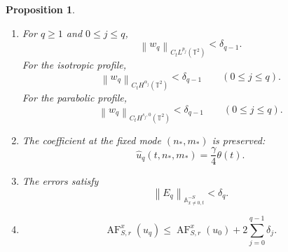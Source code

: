 \documentclass[12pt,reqno,letterpaper]{amsart}
\numberwithin{equation}{section}
\newtheorem{proposition}[theorem]{Proposition}
\theoremstyle{definition}
\newcommand{\T}{\mathbb T}
\newcommand{\A}{\mathbb A}
\newcommand{\norm}[1]{\left\lVert #1\right\rVert}
\begin{document}
\begin{proposition}
\begin{enumerate}[label=\textup{(\roman*)}]
 \item For $q\geq1$ and $0\leq j\leq q$,
 \begin{equation*}
  \norm{w_q}_{C_tL^{p_j}(\T^2)}<\delta_{q-1}.
 \end{equation*}
 For the isotropic profile,
 \begin{equation}\label{eq:periodic-induction-Sobolev-diagonal}
  \norm{w_q}_{C_tH^{\alpha_j}(\T^2)}
  <\delta_{q-1}
  \qquad(0\leq j\leq q).
 \end{equation}
 For the parabolic profile,
 \begin{equation}\label{eq:periodic-induction-parabolic-Sobolev-diagonal}
  \norm{w_q}_{C_tH^{s_j,0}(\T^2)}
  <\delta_{q-1}
  \qquad(0\leq j\leq q).
 \end{equation}

 \item The coefficient at the fixed mode $(n_*,m_*)$ is preserved:
 \begin{equation}\label{eq:periodic-induction-preserved-coefficient}
  \widehat u_q(t,n_*,m_*)=\frac\gamma4\theta(t).
 \end{equation}

 \item The errors satisfy
 \begin{equation}\label{eq:periodic-induction-error}
  \norm{E_q}_{\A^{-S}_{x\neq0,t}}<\delta_q.
 \end{equation}

 \item
 \begin{equation}\label{eq:Qbound}
  \operatorname{AF}_{S,r}^x(u_q)
  \leq\operatorname{AF}_{S,r}^x(u_0)
   +2\sum_{j=0}^{q-1}\delta_j.
 \end{equation}
\end{enumerate}
\end{proposition}
\end{document}
